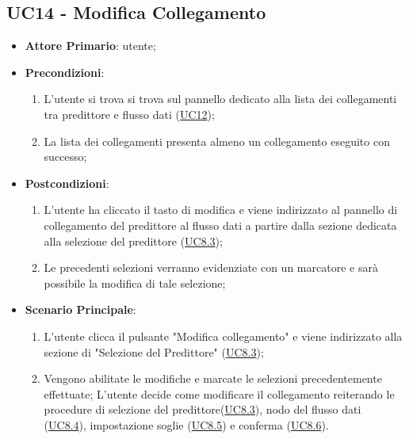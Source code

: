 	\subsection{UC14 - Modifica Collegamento}
		\begin{itemize}
			\item\textbf{Attore Primario}: utente;
			\item\textbf{Precondizioni}: 
				\begin{enumerate}
					\item L'utente si trova si trova sul pannello dedicato alla lista dei collegamenti tra predittore e flusso dati (\hyperref[par:UC12]{UC12});
					\item La lista dei collegamenti presenta almeno un collegamento eseguito con successo;
				\end{enumerate}
			\item\textbf{Postcondizioni}: 
				\begin{enumerate}
					\item L’utente ha cliccato il tasto di modifica e viene indirizzato al pannello di collegamento del predittore al flusso dati a partire dalla sezione dedicata alla selezione del predittore (\hyperref[par:UC8.3]{UC8.3}); 
					\item Le precedenti selezioni verranno evidenziate con un marcatore e sarà possibile la modifica di tale selezione; 
				\end{enumerate}
			\item\textbf{Scenario Principale}: 
				\begin{enumerate} 
					\item L'utente clicca il pulsante "Modifica collegamento" e viene indirizzato alla sezione di "Selezione del Predittore" (\hyperref[par:UC8.3]{UC8.3});  
					\item Vengono abilitate le modifiche e marcate le selezioni precedentemente effettuate; L'utente decide come modificare il collegamento reiterando le procedure di selezione del predittore(\hyperref[par:UC8.3]{UC8.3}), nodo del flusso dati (\hyperref[par:UC8.4]{UC8.4}), impostazione soglie (\hyperref[par:UC8.5]{UC8.5}) e conferma (\hyperref[par:UC8.6]{UC8.6}). 
				\end{enumerate}		
		\end{itemize}


\label{par:UC15}

